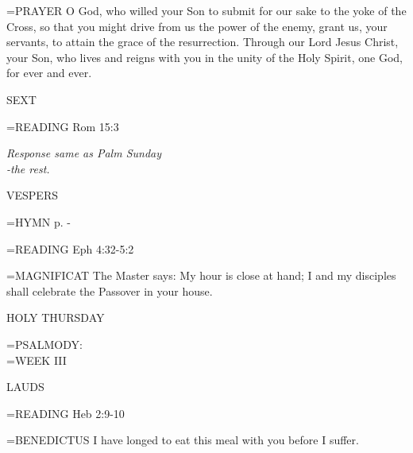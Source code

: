 \hangindent=\parindent \small{PRAYER 	O God, who willed your Son to submit for our sake to the yoke of the Cross, so that you might drive from us the power of the enemy, grant us, your servants, to attain the grace of the resurrection. Through our Lord Jesus Christ, your Son, who lives and reigns with you in the unity of the Holy Spirit, one God, for ever and ever.}

\begin{flushleft}\normalsize SEXT\\\end{flushleft}

\hangindent=\parindent \small{\uppercase{READING}}    Rom 15:3 \textbf{   \\}

\begin{center}
\textit{Response same as Palm Sunday\\
-the rest.}
\end{center}

\begin{flushleft}\normalsize VESPERS\\\end{flushleft}

\hangindent=\parindent \small{\uppercase{HYMN} p. \pageref{lent:firstHymn}-\pageref{lent:lastHymn}\\}

\hangindent=\parindent \small{\uppercase{READING}}    Eph 4:32-5:2 \textbf{   \\}

\hangindent=\parindent \small{MAGNIFICAT 	The Master says: My hour is close at hand; I and my disciples shall celebrate the Passover in your house.\\}

HOLY THURSDAY

\hangindent=\parindent \small{PSALMODY:}\\
\hangindent=\parindent  WEEK III\vspace{0.5em}

\begin{flushleft}\normalsize LAUDS\\\end{flushleft}

\hangindent=\parindent \small{\uppercase{READING}}    Heb 2:9-10 \textbf{   \\}

\hangindent=\parindent \small{BENEDICTUS 	I have longed to eat this meal with you before I suffer.\\}

